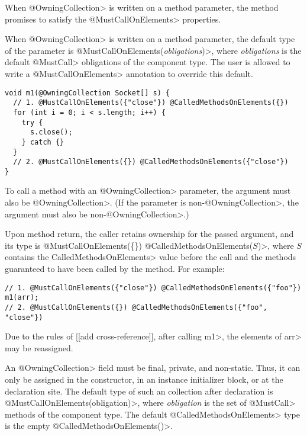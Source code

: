 When \<@OwningCollection> is written on a method parameter,
the method promises to satisfy the \<@MustCallOnElements> properties.

When \<@OwningCollection> is written on a method parameter, the default
type of the parameter is \<@MustCallOnElements(\textit{obligations})>,
where \textit{obligations} is the default \<@MustCall> obligations of the
component type. The user is allowed to write a
\<@MustCallOnElements> annotation to override this default.

\begin{verbatim}
void m1(@OwningCollection Socket[] s) {
  // 1. @MustCallOnElements({"close"}) @CalledMethodsOnElements({})
  for (int i = 0; i < s.length; i++) {
    try {
      s.close();
    } catch {}
  }
  // 2. @MustCallOnElements({}) @CalledMethodsOnElements({"close"})
}
\end{verbatim}

To call a method with an \<@OwningCollection> parameter, the argument must
also be \<@OwningCollection>.
(If the parameter is non-\<@OwningCollection>, the argument must also be non-\<@OwningCollection>.)

Upon method return, the caller retains ownership for the passed argument,
and its type is
\<@MustCallOnElements(\{\}) @CalledMethodsOnElements($S$)>, where $S$ contains
the \<CalledMethodsOnElements> value before the call and the methods guaranteed
to have been called by the method.  For example:

\begin{verbatim}
// 1. @MustCallOnElements({"close"}) @CalledMethodsOnElements({"foo"})
m1(arr);
// 2. @MustCallOnElements({}) @CalledMethodsOnElements({"foo", "close"})
\end{verbatim}

Due to the rules of [[add cross-reference]], after calling \<m1>, the elements of \<arr> may be reassigned.



An \<@OwningCollection> field must be final, private, and non-static. Thus, it
can only be assigned in the constructor, in an instance initializer block, or at the declaration site.
The default type of such an collection after declaration is \<@MustCallOnElements(obligation)>, where \textit{obligation} is the set of \<@MustCall> methods of the component type. The default \<@CalledMethodsOnElements> type is the empty \<@CalledMethodsOnElements({})>.

